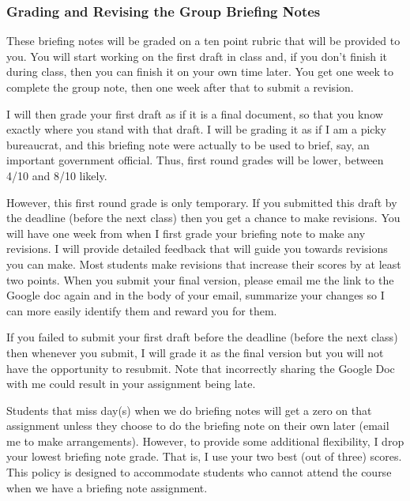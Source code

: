 \documentclass[11pt,letterpaper,final]{article}
\begin{document}
\subsubsection{Grading and Revising the Group Briefing Notes}
These briefing notes will be graded on a ten point rubric that will be provided to you. You will start working on the first draft in class and, if you don't finish it during class, then you can finish it on your own time later. You get one week to complete the group note, then one week after that to submit a revision.

I will then grade your first draft as if it is a final document, so that you know exactly where you stand with that draft. I will be grading it as if I am a picky bureaucrat, and this briefing note were actually to be used to brief, say, an important government official. Thus, first round grades will be lower, between 4/10 and 8/10 likely. 

However, this first round grade is only temporary. If you submitted this draft by the deadline (before the next class) then you get a chance to make revisions. You will have one week from when I first grade your briefing note to make any revisions. I will provide detailed feedback that will guide you towards revisions you can make. Most students make revisions that increase their scores by at least two points. When you submit your final version, please email me the link to the Google doc again and in the body of your email, summarize your changes so I can more easily identify them and reward you for them. 

If you failed to submit your first draft before the deadline (before the next class) then whenever you submit, I will grade it as the final version but you will not have the opportunity to resubmit. Note that incorrectly sharing the Google Doc with me could result in your assignment being late.

Students that miss day(s) when we do briefing notes will get a zero on that assignment unless they choose to do the briefing note on their own later (email me to make arrangements). However, to provide some additional flexibility, I drop your lowest briefing note grade. That is, I use your two best (out of three) scores. This policy is designed to accommodate students who cannot attend the course when we have a briefing note assignment.
\end{document}
